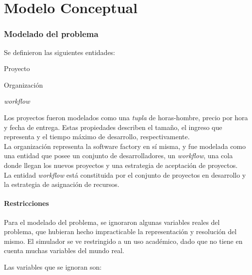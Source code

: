 \part*{Modelo Conceptual}

\section{Modelado del problema}

Se definieron las siguientes entidades:

\begin{itemize*}
    \item Proyecto
    \item Organización
    \item \textit{workflow}
\end{itemize*}

Los proyectos fueron modelados como una \textit{tupla} de horas-hombre, precio por hora y fecha de entrega. Estas propiedades describen el tamaño, el ingreso que representa y el
tiempo máximo de desarrollo, respectivamente.\\

La organización representa la software factory en sí misma, y fue modelada como una entidad que posee un conjunto de desarrolladores, un \textit{workflow}, una cola donde 
llegan los nuevos proyectos y una estrategia de aceptación de proyectos.\\

La entidad \textit{workflow} está constituida por el conjunto de proyectos en desarrollo y la estrategia de asignación de recursos.\\

\subsection{Restricciones}

Para el modelado del problema, se ignoraron algunas variables reales del problema, que hubieran hecho impracticable la representación y resolución del mismo. El simulador se ve 
restringido a un uso académico, dado que no tiene en cuenta muchas variables del mundo real.

Las variables que se ignoran son: \\

